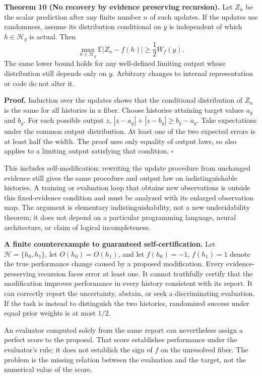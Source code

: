 \documentclass[
]{article}
\begin{document}
\textbf{Theorem 10 (No recovery by evidence preserving recursion).} Let \(Z_n\) be the scalar prediction after any finite number \(n\) of such updates. If the updates use randomness, assume its distribution conditional on \(y\) is independent of which \(h\in\mathcal H_y\) is actual. Then
\[
\max_{h\in\mathcal H_y}\mathbb E|Z_n-f(h)|
\ge\frac12W_f(y).
\tag{26}
\]
The same lower bound holds for any well-defined limiting output whose distribution still depends only on \(y\). Arbitrary changes to internal representation or code do not alter it.

\textbf{Proof.} Induction over the updates shows that the conditional distribution of \(Z_n\) is the same for all histories in a fiber. Choose histories attaining target values \(a_y\) and \(b_y\). For each possible output \(z\), \(|z-a_y|+|z-b_y|\ge b_y-a_y\). Take expectations under the common output distribution. At least one of the two expected errors is at least half the width. The proof uses only equality of output laws, so also applies to a limiting output satisfying that condition. \(\square\)

This includes self-modification: rewriting the update procedure from unchanged evidence still gives the same procedure and output law on indistinguishable histories. A training or evaluation loop that obtains new observations is outside this fixed-evidence condition and must be analyzed with its enlarged observation map. The argument is elementary indistinguishability, not a new undecidability theorem; it does not depend on a particular programming language, neural architecture, or claim of logical incompleteness.

\textbf{A finite counterexample to guaranteed self-certification.} Let \(\mathcal H=\{h_0,h_1\}\), let \(O(h_0)=O(h_1)\), and let \(f(h_0)=-1\), \(f(h_1)=1\) denote the true performance change caused by a proposed modification. Every evidence-preserving recursion faces error at least one. It cannot truthfully certify that the modification improves performance in every history consistent with its report. It can correctly report the uncertainty, abstain, or seek a discriminating evaluation. If the task is instead to distinguish the two histories, randomized success under equal prior weights is at most \(1/2\).

An evaluator computed solely from the same report can nevertheless assign a perfect score to the proposal. That score establishes performance under the evaluator's rule; it does not establish the sign of \(f\) on the unresolved fiber. The problem is the missing relation between the evaluation and the target, not the numerical value of the score.
\end{document}
